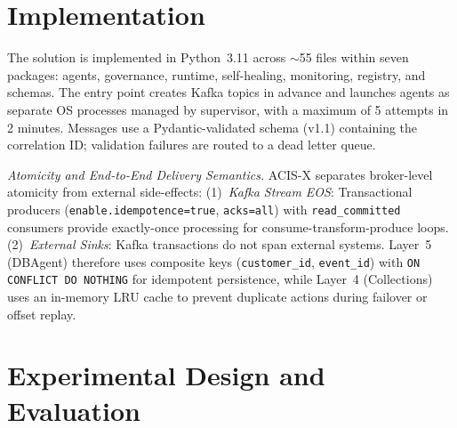 \documentclass[runningheads]{llncs}
\begin{document}
\section{Implementation}
\label{sec:implementation}

The solution is implemented in Python~3.11 across $\sim$55 files within seven packages: agents, governance, runtime, self-healing, monitoring, registry, and schemas. The entry point creates Kafka topics in advance and launches agents as separate OS processes managed by supervisor, with a maximum of 5 attempts in 2 minutes. Messages use a Pydantic-validated schema (v1.1) containing the correlation ID; validation failures are routed to a dead letter queue.

\noindent\textit{Atomicity and End-to-End Delivery Semantics.}
ACIS-X separates broker-level atomicity from external side-effects:
(1)~\textit{Kafka Stream EOS}: Transactional producers
(\texttt{enable.idempotence=true}, \texttt{acks=all}) with
\texttt{read\_committed} consumers provide exactly-once processing for
consume-transform-produce loops.
(2)~\textit{External Sinks}: Kafka transactions do not span external
systems. Layer~5 (DBAgent) therefore uses composite keys
(\texttt{customer\_id}, \texttt{event\_id}) with
\texttt{ON CONFLICT DO NOTHING} for idempotent persistence, while
Layer~4 (Collections) uses an in-memory LRU cache to prevent duplicate
actions during failover or offset replay.

\section{Experimental Design and Evaluation}
\label{sec:eval}
\end{document}
